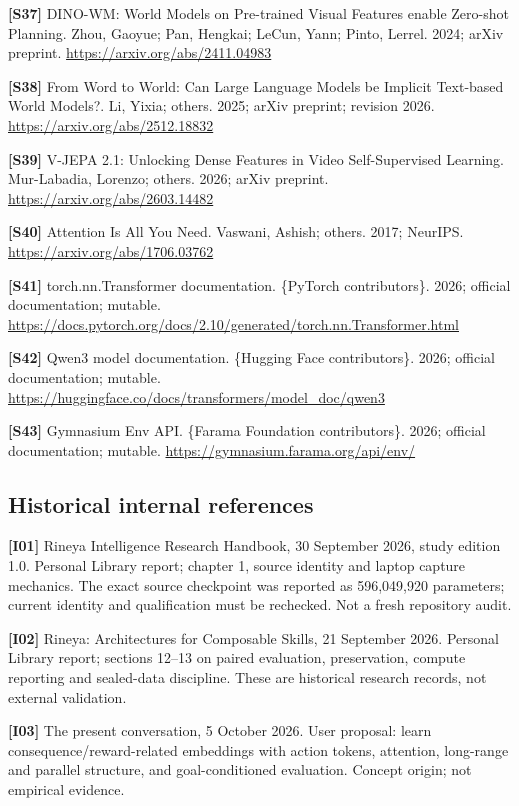 \documentclass[
  11pt,
  a4paper,
]{article}
\begin{document}
\textbf{{[}S37{]}} DINO-WM: World Models on Pre-trained Visual Features
enable Zero-shot Planning. Zhou, Gaoyue; Pan, Hengkai; LeCun, Yann;
Pinto, Lerrel. 2024; arXiv preprint.
\url{https://arxiv.org/abs/2411.04983}

\textbf{{[}S38{]}} From Word to World: Can Large Language Models be
Implicit Text-based World Models?. Li, Yixia; others. 2025; arXiv
preprint; revision 2026. \url{https://arxiv.org/abs/2512.18832}

\textbf{{[}S39{]}} V-JEPA 2.1: Unlocking Dense Features in Video
Self-Supervised Learning. Mur-Labadia, Lorenzo; others. 2026; arXiv
preprint. \url{https://arxiv.org/abs/2603.14482}

\textbf{{[}S40{]}} Attention Is All You Need. Vaswani, Ashish; others.
2017; NeurIPS. \url{https://arxiv.org/abs/1706.03762}

\textbf{{[}S41{]}} torch.nn.Transformer documentation. \{PyTorch
contributors\}. 2026; official documentation; mutable.
\url{https://docs.pytorch.org/docs/2.10/generated/torch.nn.Transformer.html}

\textbf{{[}S42{]}} Qwen3 model documentation. \{Hugging Face
contributors\}. 2026; official documentation; mutable.
\url{https://huggingface.co/docs/transformers/model_doc/qwen3}

\textbf{{[}S43{]}} Gymnasium Env API. \{Farama Foundation
contributors\}. 2026; official documentation; mutable.
\url{https://gymnasium.farama.org/api/env/}

\subsection{Historical internal
references}\label{historical-internal-references}

\textbf{{[}I01{]}} Rineya Intelligence Research Handbook, 30 September
2026, study edition 1.0. Personal Library report; chapter 1, source
identity and laptop capture mechanics. The exact source checkpoint was
reported as 596,049,920 parameters; current identity and qualification
must be rechecked. Not a fresh repository audit.

\textbf{{[}I02{]}} Rineya: Architectures for Composable Skills, 21
September 2026. Personal Library report; sections 12--13 on paired
evaluation, preservation, compute reporting and sealed-data discipline.
These are historical research records, not external validation.

\textbf{{[}I03{]}} The present conversation, 5 October 2026. User
proposal: learn consequence/reward-related embeddings with action
tokens, attention, long-range and parallel structure, and
goal-conditioned evaluation. Concept origin; not empirical evidence.
\end{document}
